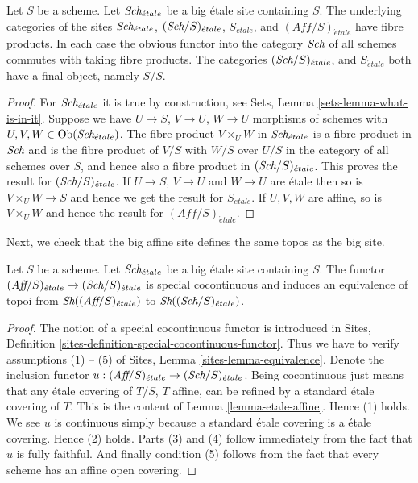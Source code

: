 \begin{lemma}
\label{lemma-fibre-products-etale}
Let $S$ be a scheme. Let $\textit{Sch}_{\acute{e}tale}$ be a big \'etale
site containing $S$. The underlying categories of the sites
$\textit{Sch}_{\acute{e}tale}$, $(\textit{Sch}/S)_{\acute{e}tale}$,
$S_{\acute{e}tale}$, and $(\textit{Aff}/S)_{\acute{e}tale}$ have fibre products.
In each case the obvious functor into the category $\textit{Sch}$ of
all schemes commutes with taking fibre products. The categories
$(\textit{Sch}/S)_{\acute{e}tale}$, and $S_{\acute{e}tale}$ both have a
final object, namely $S/S$.
\end{lemma}

\begin{proof}
For $\textit{Sch}_{\acute{e}tale}$ it is true by construction, see
Sets, Lemma \ref{sets-lemma-what-is-in-it}.
Suppose we have $U \to S$, $V \to U$, $W \to U$ morphisms
of schemes with $U, V, W \in \mathop{\rm Ob}\nolimits(\textit{Sch}_{\acute{e}tale})$.
The fibre product $V \times_U W$ in $\textit{Sch}_{\acute{e}tale}$
is a fibre product in $\textit{Sch}$ and
is the fibre product of $V/S$ with $W/S$ over $U/S$ in
the category of all schemes over $S$, and hence also a
fibre product in $(\textit{Sch}/S)_{\acute{e}tale}$.
This proves the result for $(\textit{Sch}/S)_{\acute{e}tale}$.
If $U \to S$, $V \to U$ and $W \to U$ are \'etale then so is
$V \times_U W \to S$ and hence we get the result for $S_{\acute{e}tale}$.
If $U, V, W$ are affine, so is $V \times_U W$ and hence the
result for $(\textit{Aff}/S)_{\acute{e}tale}$.
\end{proof}

\noindent
Next, we check that the big affine site defines the same
topos as the big site.

\begin{lemma}
\label{lemma-affine-big-site-etale}
Let $S$ be a scheme. Let $\textit{Sch}_{\acute{e}tale}$ be a big \'etale
site containing $S$.
The functor
$(\textit{Aff}/S)_{\acute{e}tale} \to (\textit{Sch}/S)_{\acute{e}tale}$
is special cocontinuous and induces an equivalence of topoi from
$\mathop{\textit{Sh}}\nolimits((\textit{Aff}/S)_{\acute{e}tale})$ to
$\mathop{\textit{Sh}}\nolimits((\textit{Sch}/S)_{\acute{e}tale})$.
\end{lemma}

\begin{proof}
The notion of a special cocontinuous functor is introduced in
Sites, Definition \ref{sites-definition-special-cocontinuous-functor}.
Thus we have to verify assumptions (1) -- (5) of
Sites, Lemma \ref{sites-lemma-equivalence}.
Denote the inclusion functor
$u : (\textit{Aff}/S)_{\acute{e}tale} \to (\textit{Sch}/S)_{\acute{e}tale}$.
Being cocontinuous just means that any \'etale covering of
$T/S$, $T$ affine, can be refined by a standard \'etale covering of $T$.
This is the content of
Lemma \ref{lemma-etale-affine}.
Hence (1) holds. We see $u$ is continuous simply because a standard
\'etale covering is a \'etale covering. Hence (2) holds.
Parts (3) and (4) follow immediately from the fact that $u$ is
fully faithful. And finally condition (5) follows from the
fact that every scheme has an affine open covering.
\end{proof}

